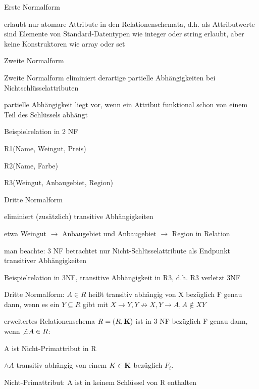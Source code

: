 \documentclass[a4paper]{article}
\begin{document}
\begin{multicols}{3}
\begin{enumerate*}
    \item Erste Normalform
    \begin{itemize*}
        \item erlaubt nur atomare Attribute in den Relationenschemata, d.h. als Attributwerte sind Elemente von Standard-Datentypen wie integer oder string erlaubt, aber keine Konstruktoren wie array oder set
    \end{itemize*}
    \item Zweite Normalform
    \begin{itemize*}
        \item Zweite Normalform eliminiert derartige partielle Abhängigkeiten bei Nichtschlüsselattributen
        \item partielle Abhängigkeit liegt vor, wenn ein Attribut funktional schon von einem Teil des Schlüssels abhängt
        \item Beispielrelation in 2 NF
        \begin{itemize*}
            \item R1(Name, Weingut, Preis)
            \item R2(Name, Farbe)
            \item R3(Weingut, Anbaugebiet, Region)
        \end{itemize*}
    \end{itemize*}
    \item Dritte Normalform
    \begin{itemize*}
        \item eliminiert (zusätzlich) transitive Abhängigkeiten
        \item etwa Weingut $\rightarrow$ Anbaugebiet und Anbaugebiet $\rightarrow$ Region in Relation
        \item man beachte: 3 NF betrachtet nur Nicht-Schlüsselattribute als Endpunkt transitiver Abhängigkeiten
        \item Beispielrelation in 3NF, transitive Abhängigkeit in R3, d.h. R3 verletzt 3NF
    \end{itemize*}
\end{enumerate*}

Dritte Normalform:
$A \in R$ heißt transitiv abhängig von X bezüglich F genau dann, wenn es ein $Y\subseteq R$ gibt mit $X \rightarrow Y, Y \not\rightarrow X, Y \rightarrow A, A \not\in XY$
\begin{itemize*}
    \item erweitertes Relationenschema $R=(R, \bf{K})$ ist in 3 NF bezüglich F genau dann, wenn $\not\exists A \in R$:
    \item A ist Nicht-Primattribut in R
    \item $\wedge A$ transitiv abhängig von einem $K\in \bf{K}$ bezüglich $F_i$.
    \item Nicht-Primattribut: A ist in keinem Schlüssel von R enthalten
\end{itemize*}


\end{multicols}
\end{document}
